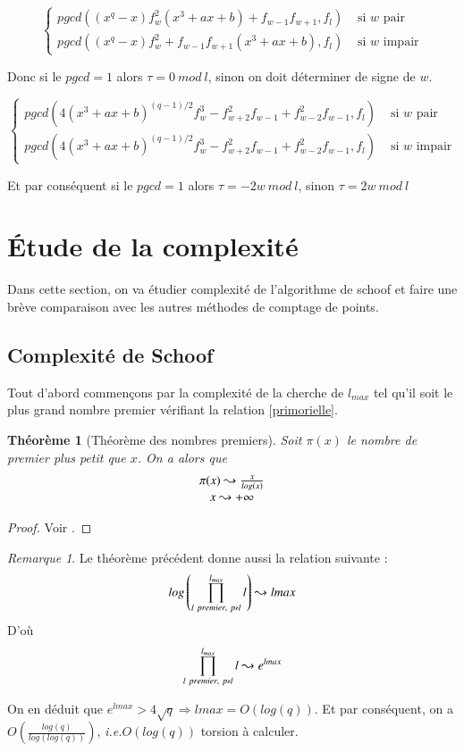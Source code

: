 \documentclass{article}%
\theoremstyle{plain}
\newtheorem{theoreme}{Théorème}[section]
\theoremstyle{definition}
\theoremstyle{plain}
\theoremstyle{plain}
\theoremstyle{remark}
\newtheorem*{remarque}{Remarque}
\newcommand\ie{\textit{i.e.}}
\begin{document}
\begin{equation}
\begin{cases}pgcd((x^{q} - x)f_{w}^{2}(x^{3} + ax +b) + f_{w - 1}f_{w + 1},f_{l})&\text{ si }w\text{ pair}\\
pgcd((x^{q} - x)f_{w}^{2} + f_{w - 1}f_{w + 1}(x^{3} + ax +b),f_{l})&\text{ si }w\text{ impair}
\end{cases}
\end{equation}

Donc si le $pgcd = 1$ alors $\tau = 0\ mod\ l$, sinon on doit déterminer de signe de $w$. 

\begin{equation}
\begin{cases}pgcd(4(x^{3} + ax +  b)^{(q-1)/2}f_{w}^{3} - f_{w + 2}^{2}f_{w - 1} + f_{w - 2}^{2}f_{w - 1},f_{l})&\text{ si }w\text{ pair}\\
pgcd(4(x^{3} + ax +  b)^{(q-1)/2}f_{w}^{3} - f_{w + 2}^{2}f_{w - 1} + f_{w - 2}^{2}f_{w - 1},f_{l})&\text{ si }w\text{ impair}
\end{cases}
\end{equation}

Et par conséquent si le $pgcd = 1$ alors $\tau = -2w\ mod\ l$, sinon $\tau = 2w\ mod\ l$


\section{Étude de la complexité}

Dans cette section, on va étudier complexité de l'algorithme de schoof et faire une brève comparaison avec les autres méthodes de comptage de points.

\subsection{Complexité de Schoof}

Tout d'abord commençons par la complexité de la cherche de $l_{max}$ tel qu'il soit le plus grand nombre premier vérifiant la relation \eqref{primorielle}.

\begin{theoreme}[Théorème des nombres premiers]
Soit $\pi(x)$ le nombre de premier plus petit que $x$. On a alors que $$
\begin{array}{cl cl}
\pi(x)\leadsto\frac{x}{log(x)}\\
x \leadsto +\infty 
\end{array}$$
\end{theoreme}
\begin{proof}
Voir \cite{ref5}.
\end{proof}
\begin{remarque}
Le théorème précédent donne aussi la relation suivante :
$$log\left(\prod_{l\ premier,\ p\nshortmid l}^{l_{max}}l\right) \leadsto lmax$$
D'où $$\prod_{l\ premier,\ p\nshortmid l}^{l_{max}}l\leadsto e^{lmax}$$  
\end{remarque}
On en déduit que $e^{lmax}>4\sqrt{q} \Rightarrow lmax = O(log(q))$. Et par conséquent, on a $O\left(\frac{log(q)}{log(log(q))}\right)$, \ie $O(log(q))$ torsion à calculer.
\end{document}
